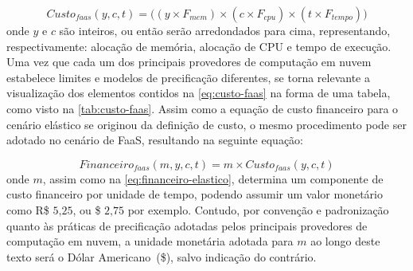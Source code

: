 \documentclass[english,brazilian]{UNISINOSmonografia} %
\begin{document}
\begin{equation}
\label{eq:custo-faas}
Custo_{faas}(y,c,t) = \big( (y \times F_{mem}) \times (c \times F_{cpu}) \times (t \times F_{tempo}) \big)
\end{equation}
onde $ y $ e $ c $ são inteiros, ou então serão arredondados para cima, representando, respectivamente: alocação de memória, alocação de CPU e tempo de execução.
Uma vez que cada um dos principais provedores de computação em nuvem estabelece limites e modelos de precificação diferentes, se torna relevante a visualização dos elementos contidos na \autoref{eq:custo-faas} na forma de uma tabela, como visto na \autoref{tab:custo-faas}.
Assim como a equação de custo financeiro para o cenário elástico se originou da definição de custo, o mesmo procedimento pode ser adotado no cenário de FaaS, resultando na seguinte equação:

\begin{equation}
\label{eq:financeiro-faas}
Financeiro_{faas}(m,y,c,t) = m \times Custo_{faas}(y,c,t)
\end{equation}
onde $ m $, assim como na \autoref{eq:financeiro-elastico}, determina um componente de custo financeiro por unidade de tempo, podendo assumir um valor monetário como R\$ $ 5\text{,}25 $,  ou \$ $2\text{,}75$ por exemplo.
Contudo, por convenção e padronização quanto às práticas de precificação adotadas pelos principais provedores de computação em nuvem, a unidade monetária adotada para $ m $ ao longo deste texto será o Dólar Americano~(\$), salvo indicação do contrário.
\end{document}
